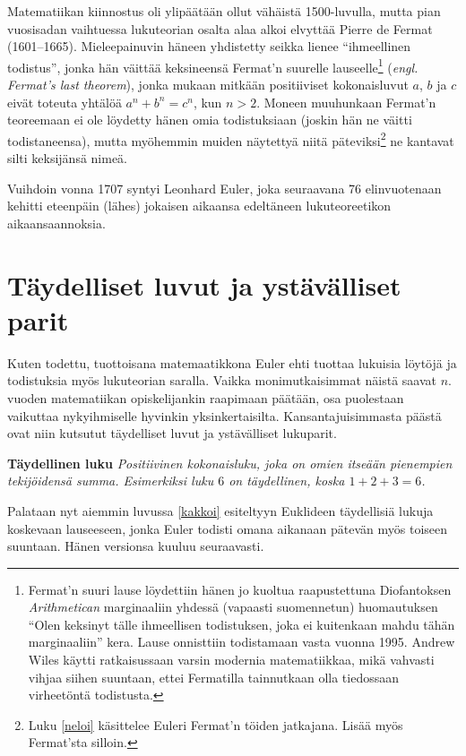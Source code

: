 \documentclass[a4paper,11pt]{article}
\begin{document}
Matematiikan kiinnostus oli ylipäätään ollut vähäistä 1500-luvulla, mutta pian vuosisadan vaihtuessa lukuteorian osalta alaa alkoi elvyttää Pierre de Fermat (1601–1665). Mieleepainuvin häneen yhdistetty seikka lienee \enquote{ihmeellinen todistus}, jonka hän väittää keksineensä Fermat'n suurelle lauseelle\footnote{Fermat'n suuri lause löydettiin hänen jo kuoltua raapustettuna Diofantoksen \textit{Arithmetican} marginaaliin yhdessä (vapaasti suomennetun) huomautuksen \enquote{Olen keksinyt tälle ihmeellisen todistuksen, joka ei kuitenkaan mahdu tähän marginaaliin} kera. Lause onnisttiin todistamaan vasta vuonna 1995. Andrew Wiles käytti ratkaisussaan varsin modernia matematiikkaa, mikä vahvasti vihjaa siihen suuntaan, ettei Fermatilla tainnutkaan olla tiedossaan virheetöntä todistusta.} (\textit{engl. Fermat's last theorem}), jonka mukaan mitkään positiiviset kokonaisluvut $a$, $b$ ja $c$ eivät toteuta yhtälöä $a^n+b^n=c^n$, kun $n>2$. Moneen muuhunkaan Fermat'n teoreemaan ei ole löydetty hänen omia todistuksiaan (joskin hän ne väitti todistaneensa), mutta myöhemmin muiden näytettyä niitä päteviksi\footnote{Luku \ref{neloi} käsittelee Euleri Fermat'n töiden jatkajana. Lisää myös Fermat'sta silloin.} ne kantavat silti keksijänsä nimeä.

Vuihdoin vonna 1707 syntyi Leonhard Euler, joka seuraavana 76 elinvuotenaan kehitti eteenpäin (lähes) jokaisen aikaansa edeltäneen lukuteoreetikon aikaansaannoksia.

\section{Täydelliset luvut ja ystävälliset parit}
\label{kolmoi}

Kuten todettu, tuottoisana matemaatikkona Euler ehti tuottaa lukuisia löytöjä ja todistuksia myös lukuteorian saralla. Vaikka monimutkaisimmat näistä saavat $n$. vuoden matematiikan opiskelijankin raapimaan päätään, osa puolestaan vaikuttaa nykyihmiselle hyvinkin yksinkertaisilta. Kansantajuisimmasta päästä ovat niin kutsutut täydelliset luvut ja ystävälliset lukuparit.

\begin{center}
    \textbf{Täydellinen luku} \textit{Positiivinen kokonaisluku, joka on omien itseään pienempien tekijöidensä summa. \textit{Esimerkiksi} luku $6$ on täydellinen, koska $1+2+3=6$.}
\end{center}

Palataan nyt aiemmin luvussa \ref{kakkoi} esiteltyyn Euklideen täydellisiä lukuja koskevaan lauseeseen, jonka Euler todisti omana aikanaan pätevän myös toiseen suuntaan. Hänen versionsa kuuluu seuraavasti.
\end{document}
